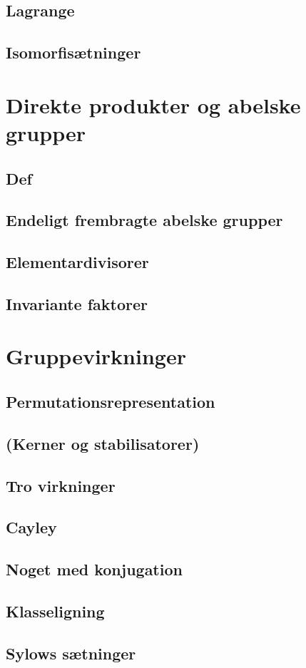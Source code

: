 \documentclass[11pt]{article}
\begin{document}
\subsection*{Lagrange}

\subsection*{Isomorfisætninger}

\section*{Direkte produkter og abelske grupper}
\subsection*{Def}
\subsection*{Endeligt frembragte abelske grupper}
\subsection*{Elementardivisorer}
\subsection*{Invariante faktorer}

\section*{Gruppevirkninger}
\subsection*{Permutationsrepresentation}
\subsection*{(Kerner og stabilisatorer)}
\subsection*{Tro virkninger}
\subsection*{Cayley}
\subsection*{Noget med konjugation}
\subsection*{Klasseligning}
\subsection*{Sylows sætninger}
\end{document}
